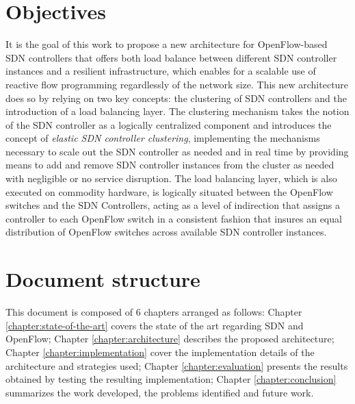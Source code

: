 \section{Objectives}
It is the goal of this work to propose a new architecture for OpenFlow-based \gls{SDN} controllers that offers both load balance between different \gls{SDN} controller instances and a resilient infrastructure, which enables for a scalable use of reactive flow programming regardlessly of the network size.
This new architecture does so by relying on two key concepts: the clustering of \gls{SDN} controllers and the introduction of a load balancing layer.
The clustering mechanism takes the notion of the \gls{SDN} controller as a logically centralized component and introduces the concept of \emph{elastic \gls{SDN} controller clustering}, implementing the mechanisms necessary to scale out the \gls{SDN} controller as needed and in real time by providing means to add and remove \gls{SDN} controller instances from the cluster as needed with negligible or no service disruption.
The load balancing layer, which is also executed on commodity hardware, is logically situated between the OpenFlow switches and the SDN Controllers, acting as a level of indirection that assigns a controller to each OpenFlow switch in a consistent fashion that insures an equal distribution of OpenFlow switches across available SDN controller instances.\\
%
\section{Document structure}
This document is composed of 6 chapters arranged as follows: Chapter \ref{chapter:state-of-the-art} covers the state of the art regarding \gls{SDN} and OpenFlow; Chapter \ref{chapter:architecture} describes the proposed architecture; Chapter \ref{chapter:implementation} cover the implementation details of the architecture and strategies used; Chapter \ref{chapter:evaluation} presents the results obtained by testing the resulting implementation; Chapter \ref{chapter:conclusion} summarizes the work developed, the problems identified and future work.